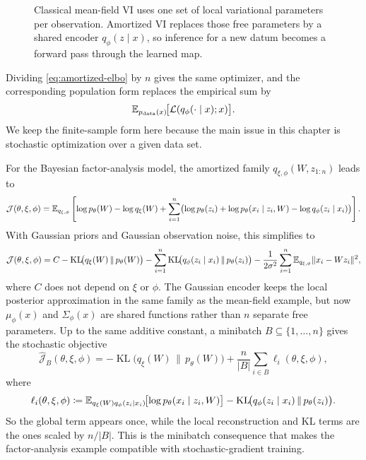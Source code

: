 \begin{figure}[H]
  \centering
  
  \caption{Classical mean-field VI uses one set of local variational parameters per observation.
  Amortized VI replaces those free parameters by a shared encoder $q_\phi(z\mid x)$, so inference for a new datum becomes a forward pass through the learned map.}
  \label{fig:vi-amortization}
\end{figure}

Dividing \eqref{eq:amortized-elbo} by \(n\) gives the same optimizer, and the corresponding population form replaces the empirical sum by
\[
  \mathbb{E}_{p_{\mathrm{data}}(x)}\!\bigl[\mathcal{L}(q_\phi(\cdot\mid x);x)\bigr].
\]
We keep the finite-sample form here because the main issue in this chapter is stochastic optimization over a given data set.

For the Bayesian factor-analysis model, the amortized family \(q_{\xi,\phi}(W,z_{1:n})\) leads to
\[
  \mathcal{J}(\theta,\xi,\phi)
  =
  \mathbb{E}_{q_{\xi,\phi}}
  \left[
    \log p_\theta(W) - \log q_\xi(W)
    +
    \sum_{i=1}^n
    \bigl(
      \log p_\theta(z_i)
      +
      \log p_\theta(x_i\mid z_i,W)
      -
      \log q_\phi(z_i\mid x_i)
    \bigr)
  \right].
\]
With Gaussian priors and Gaussian observation noise, this simplifies to
\begin{equation}
  \mathcal{J}(\theta,\xi,\phi)
  =
  C
  -
  \operatorname{KL}\!\bigl(q_\xi(W)\,\|\,p_\theta(W)\bigr)
  -
  \sum_{i=1}^n
  \operatorname{KL}\!\bigl(q_\phi(z_i\mid x_i)\,\|\,p_\theta(z_i)\bigr)
  -
  \frac{1}{2\sigma^2}
  \sum_{i=1}^n
  \mathbb{E}_{q_{\xi,\phi}}\lVert x_i-Wz_i\rVert^2,
  \label{eq:amortized-factor-analysis-elbo}
\end{equation}
where \(C\) does not depend on \(\xi\) or \(\phi\).
The Gaussian encoder keeps the local posterior approximation in the same family as the mean-field example, but now \(\mu_\phi(x)\) and \(\Sigma_\phi(x)\) are shared functions rather than \(n\) separate free parameters.
Up to the same additive constant, a minibatch \(B\subseteq\{1,\dots,n\}\) gives the stochastic objective
\begin{equation}
  \hat{\mathcal{J}}_B(\theta,\xi,\phi)
  =
  -\operatorname{KL}\!\bigl(q_\xi(W)\,\|\,p_\theta(W)\bigr)
  +
  \frac{n}{|B|}
  \sum_{i\in B} \ell_i(\theta,\xi,\phi),
  \label{eq:amortized-factor-analysis-minibatch}
\end{equation}
where
\[
  \ell_i(\theta,\xi,\phi)
  \coloneqq
  \mathbb{E}_{q_\xi(W)q_\phi(z_i\mid x_i)}\!\bigl[\log p_\theta(x_i\mid z_i,W)\bigr]
  -
  \operatorname{KL}\!\bigl(q_\phi(z_i\mid x_i)\,\|\,p_\theta(z_i)\bigr).
\]
So the global term appears once, while the local reconstruction and KL terms are the ones scaled by \(n/|B|\).
This is the minibatch consequence that makes the factor-analysis example compatible with stochastic-gradient training.

